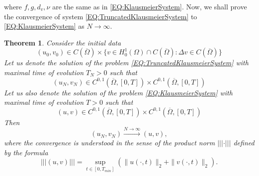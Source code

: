 \documentclass[12pt, a4paper]{article}
\theoremstyle{break}
\newtheorem{thm}{Theorem}[section]
\theoremstyle{break}
\theoremstyle{break}
\theoremstyle{break}
\theoremstyle{break}
\theoremstyle{break}
\theoremstyle{break}
\begin{document}
where $f, g, d_v, \nu$ are the same as in \eqref{EQ:KlausmeierSystem}. Now, we shall prove the convergence of system \eqref{EQ:TruncatedKlausmeierSystem} to \eqref{EQ:KlausmeierSystem} as $N \rightarrow \infty$.
\begin{thm}
    \label{thm:ApproximationWithFiniteKernels}
    Consider the initial data 
    $$(u_0, v_0) \in C(\overline{\Omega}) \times \{v \in H^1_0(\Omega) \cap C(\overline{\Omega}): \Delta v \in C(\overline{\Omega})\}$$
    Let us denote the solution of the problem \eqref{EQ:TruncatedKlausmeierSystem} with maximal time of evolution $T_N > 0$ such that
    $$(u_N, v_N) \in C^{0, 1}(\overline{\Omega}, [0,T]) \times C^{0, 1}(\overline{\Omega}, [0,T])$$
    Let us also denote the solution of the problem \eqref{EQ:KlausmeierSystem} with maximal time of evolution $T > 0$ such that
    $$(u, v) \in C^{0, 1}(\overline{\Omega}, [0,T]) \times C^{0, 1}(\overline{\Omega}, [0,T])$$
    Then
    \begin{equation*}
        (u_N, v_N) \xrightarrow{N \rightarrow \infty} (u, v),
    \end{equation*}
    where the convergence is understood in the sense of the product norm $||| \cdot |||$ defined by the formula
    \begin{equation}
        ||| (u, v) ||| = \sup_{t \in [0, T_{min}]}\left(\| u(\cdot, t) \|_2 + \|v(\cdot, t) \|_2 \right).
    \end{equation}
\end{thm}
\end{document}
